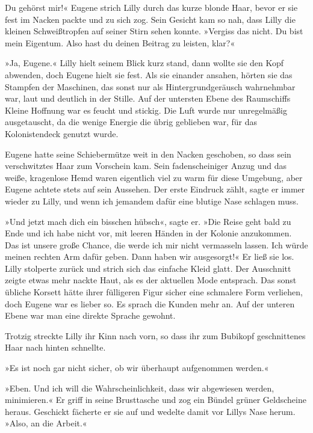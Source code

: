 Du gehörst mir!« Eugene strich Lilly durch das kurze blonde Haar,
bevor er sie fest im Nacken packte und zu sich zog. Sein Gesicht
kam so nah, dass Lilly die kleinen Schweißtropfen auf seiner Stirn
sehen konnte. »Vergiss das nicht. Du bist mein Eigentum. Also hast
du deinen Beitrag zu leisten, klar?«

»Ja, Eugene.« Lilly hielt seinem Blick kurz stand, dann wollte sie
den Kopf abwenden, doch Eugene hielt sie fest. Als sie einander
ansahen, hörten sie das Stampfen der Maschinen, das sonst nur als
Hintergrundgeräusch wahrnehmbar war, laut und deutlich in der
Stille. Auf der untersten Ebene des Raumschiffs Kleine Hoffnung war
es feucht und stickig. Die Luft wurde nur unregelmäßig
ausgetauscht, da die wenige Energie die übrig geblieben war, für
das Kolonistendeck genutzt wurde.

Eugene hatte seine Schiebermütze weit in den Nacken geschoben, so
dass sein verschwitztes Haar zum Vorschein kam. Sein
fadenscheiniger Anzug und das weiße, kragenlose Hemd waren
eigentlich viel zu warm für diese Umgebung, aber Eugene achtete
stets auf sein Aussehen. Der erste Eindruck zählt, sagte er immer
wieder zu Lilly, und wenn ich jemandem dafür eine blutige Nase
schlagen muss.

»Und jetzt mach dich ein bisschen hübsch«, sagte er. »Die Reise
geht bald zu Ende und ich habe nicht vor, mit leeren Händen in der
Kolonie anzukommen. Das ist unsere große Chance, die werde ich mir
nicht vermasseln lassen. Ich würde meinen rechten Arm dafür geben.
Dann haben wir ausgesorgt!« Er ließ sie los. Lilly stolperte zurück
und strich sich das einfache Kleid glatt. Der Ausschnitt zeigte
etwas mehr nackte Haut, als es der aktuellen Mode entsprach. Das
sonst übliche Korsett hätte ihrer fülligeren Figur sicher eine
schmalere Form verliehen, doch Eugene war es lieber so. Es sprach
die Kunden mehr an. Auf der unteren Ebene war man eine direkte
Sprache gewohnt.

Trotzig streckte Lilly ihr Kinn nach vorn, so dass ihr zum Bubikopf
geschnittenes Haar nach hinten schnellte.

»Es ist noch gar nicht sicher, ob wir überhaupt aufgenommen
werden.«

»Eben. Und ich will die Wahrscheinlichkeit, dass wir abgewiesen
werden, minimieren.« Er griff in seine Brusttasche und zog ein
Bündel grüner Geldscheine heraus. Geschickt fächerte er sie auf und
wedelte damit vor Lillys Nase herum. »Also, an die Arbeit.«

\tb

